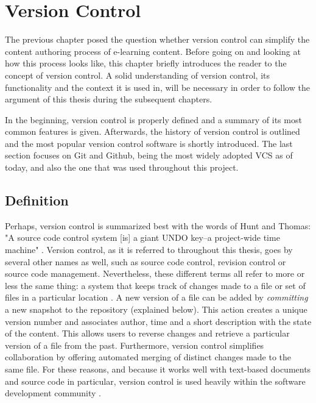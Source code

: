 \chapter{Version Control} \label{chapter:version-control}
The previous chapter posed the question whether version control can simplify the content authoring process of e-learning content. Before going on and looking at how this process looks like, this chapter briefly introduces the reader to the concept of version control. A solid understanding of version control, its functionality and the context it is used in, will be necessary in order to follow the argument of this thesis during the subsequent chapters.

In the beginning, version control is properly defined and a summary of its most common features is given. Afterwards, the history of version control is outlined and the most popular version control software is shortly introduced. The last section focuses on Git and Github, being the most widely adopted VCS as of today, and also the one that was used throughout this project.

\section{Definition}
Perhaps, version control is summarized best with the words of Hunt and Thomas: "A source code control system [is] a giant UNDO key–a project-wide time machine" \cite{hunt_pragmatic_1999}. Version control, as it is referred to throughout this thesis, goes by several other names as well, such as source code control, revision control or source code management. Nevertheless, these different terms all refer to more or less the same thing: a system that keeps track of changes made to a file or set of files in a particular location \cite{ruparelia_history_2010}. A new version of a file can be added by \textit{committing} a new snapshot to the repository (explained below). This action creates a unique version number and associates author, time and a short description with the state of the content. This allows users to reverse changes and retrieve a particular version of a file from the past. Furthermore, version control simplifies collaboration by offering automated merging of distinct changes made to the same file. For these reasons, and because it works well with text-based documents and source code in particular, version control is used heavily within the software development community \cite{_stack_2015}.

